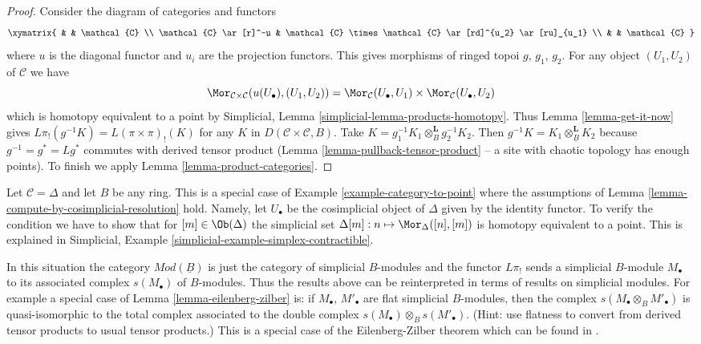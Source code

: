 \begin{proof}
Consider the diagram of categories and functors
$$
\xymatrix{
& & \mathcal{C} \\
\mathcal{C} \ar[r]^-u &
\mathcal{C} \times \mathcal{C} \ar[rd]^{u_2} \ar[ru]_{u_1} \\
& & \mathcal{C}
}
$$
where $u$ is the diagonal functor and $u_i$ are the projection functors.
This gives morphisms of ringed topoi $g$, $g_1$, $g_2$.
For any object $(U_1, U_2)$ of $\mathcal{C}$ we have
$$
\Mor_{\mathcal{C} \times \mathcal{C}}(u(U_\bullet), (U_1, U_2)) =
\Mor_\mathcal{C}(U_\bullet, U_1) \times \Mor_\mathcal{C}(U_\bullet, U_2)
$$
which is homotopy equivalent to a point by
Simplicial, Lemma \ref{simplicial-lemma-products-homotopy}.
Thus Lemma \ref{lemma-get-it-now} gives
$L\pi_!(g^{-1}K) = L(\pi \times \pi)_!(K)$ for any $K$ in
$D(\mathcal{C} \times \mathcal{C}, B)$.
Take $K = g_1^{-1}K_1 \otimes_B^\mathbf{L} g_2^{-1}K_2$.
Then $g^{-1}K = K_1 \otimes^\mathbf{L}_{\underline{B}} K_2$
because $g^{-1} = g^* = Lg^*$ commutes with derived tensor product
(Lemma \ref{lemma-pullback-tensor-product}
-- a site with chaotic topology has enough points).
To finish we apply Lemma \ref{lemma-product-categories}.
\end{proof}

\begin{remark}
\label{remark-simplicial-modules}
Let $\mathcal{C} = \Delta$ and let $B$ be any ring. This is a special
case of Example \ref{example-category-to-point} where the assumptions
of Lemma \ref{lemma-compute-by-cosimplicial-resolution} hold.
Namely, let $U_\bullet$ be the cosimplicial object of $\Delta$ given by
the identity functor. To verify the condition we have to show that for
$[m] \in \Ob(\Delta)$ the simplicial set
$\Delta[m] : n \mapsto \Mor_\Delta([n], [m])$ is homotopy equivalent
to a point. This is explained in
Simplicial, Example \ref{simplicial-example-simplex-contractible}.

\medskip\noindent
In this situation the category $\textit{Mod}(\underline{B})$
is just the category of simplicial $B$-modules and the
functor $L\pi_!$ sends a simplicial $B$-module $M_\bullet$ to its associated
complex $s(M_\bullet)$ of $B$-modules. Thus the results above can be
reinterpreted in terms of results on simplicial modules. For example
a special case of Lemma \ref{lemma-eilenberg-zilber} is:
if $M_\bullet$, $M'_\bullet$ are flat simplicial
$B$-modules, then the complex $s(M_\bullet \otimes_B M'_\bullet)$ is
quasi-isomorphic to the total complex associated to the double complex
$s(M_\bullet) \otimes_B s(M'_\bullet)$.
(Hint: use flatness to convert from derived tensor products to usual
tensor products.)
This is a special case of the Eilenberg-Zilber theorem
which can be found in \cite{Eilenberg-Zilber}.
\end{remark}

